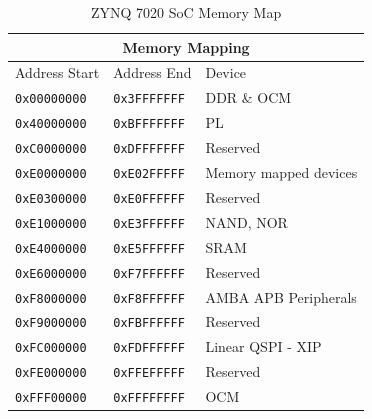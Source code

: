 \begin{table}[ht]
\centering
\begin{tabular}{ |p{3cm}||p{3cm}||p{5cm}|  }
    \hline
    \multicolumn{3}{|c|}{Memory Mapping} \\
    \hline
    Address Start&Address End&Device \\
    \hline
    \texttt{0x00000000}&\texttt{0x3FFFFFFF}&DDR \& OCM\\
    \texttt{0x40000000}&\texttt{0xBFFFFFFF}&PL  \\
    \texttt{0xC0000000}&\texttt{0xDFFFFFFF}&Reserved\\
    \texttt{0xE0000000}&\texttt{0xE02FFFFF}&Memory mapped devices\\
    \texttt{0xE0300000}&\texttt{0xE0FFFFFF}&Reserved\\
    \texttt{0xE1000000}&\texttt{0xE3FFFFFF}&NAND, NOR\\
    \texttt{0xE4000000}&\texttt{0xE5FFFFFF}&SRAM\\
    \texttt{0xE6000000}&\texttt{0xF7FFFFFF}&Reserved\\
    \texttt{0xF8000000}&\texttt{0xF8FFFFFF}&AMBA APB Peripherals\\
    \texttt{0xF9000000}&\texttt{0xFBFFFFFF}&Reserved\\
    \texttt{0xFC000000}&\texttt{0xFDFFFFFF}&Linear QSPI - XIP\\
    \texttt{0xFE000000}&\texttt{0xFFEFFFFF}&Reserved\\
    \texttt{0xFFF00000}&\texttt{0xFFFFFFFF}&OCM \\
    \hline
\end{tabular}
\caption{ZYNQ 7020 SoC Memory Map}
\label{tab:zynq_memory_map}
\end{table}



